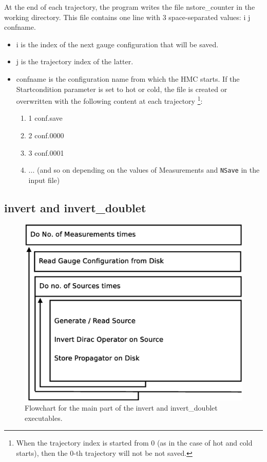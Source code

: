 At the end of each trajectory, the program writes the file {\ttfamily nstore\_counter} in the working directory.
This file contains one line with $3$ space-separated values: {\ttfamily i j confname}.
\begin{itemize}
  \item
  {\ttfamily i} is the index of the next gauge configuration that will be saved.
  \item
  {\ttfamily j} is the trajectory index of the latter.
  \item
  {\ttfamily confname} is the configuration name from which the HMC starts.
  If the {\ttfamily Startcondition} parameter is set to {\ttfamily hot} or {\ttfamily cold},
  the file is created or overwritten with the following content at each trajectory
    \footnote{When the trajectory index is started from $0$ (as in the case of hot and cold starts), then the $0$-th trajectory will not be not saved.}: 
  \begin{enumerate}
    \item 
    { 1 conf.save}
    \item 
    { 2 conf.0000}
    \item
    { 3 conf.0001}
    \item
      ... (and so on depending on the values of {\ttfamily Measurements} and \texttt{NSave} in the input file)
  \end{enumerate}
\end{itemize}

\subsection{{\ttfamily invert} and {\ttfamily invert\_doublet}}

\begin{figure}[t]
  \centering
  \includegraphics[width=0.7\linewidth]{invertflow.eps}
  \caption{Flowchart for the main part of the {\ttfamily invert} and
    {\ttfamily invert\_doublet} executables.}
  \label{fig:invertflow}
\end{figure}

